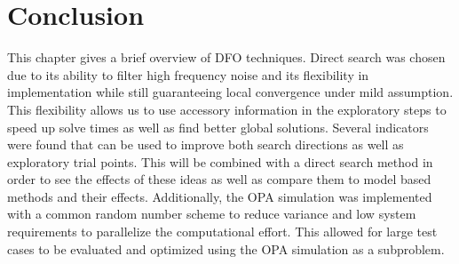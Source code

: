 
\section{Conclusion}
This chapter gives a brief overview of DFO techniques.  Direct search was chosen due to its ability to filter high frequency noise and its flexibility in implementation while still guaranteeing local convergence under mild assumption.  This flexibility allows us to use accessory information in the exploratory steps to speed up solve times as well as find better global solutions.
Several indicators were found that can be used to improve both search directions as well as exploratory trial points.  This will be combined with a direct search method in order to see the effects of these ideas as well as compare them to model based methods and their effects.  Additionally, the OPA simulation was implemented with a common random number scheme to reduce variance and low system requirements to parallelize the computational effort.  This allowed for large test cases to be evaluated and optimized using the OPA simulation as a subproblem.










%
